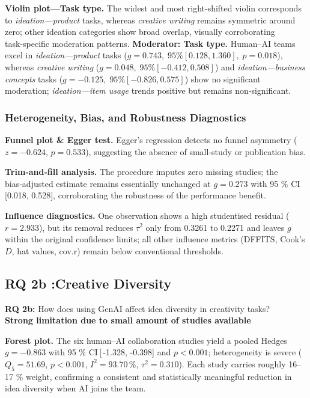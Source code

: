 \documentclass[manuscript, screen, review, acmsmall, anonymous]{acmart}
\begin{document}
\textbf{Violin plot—Task type.} The widest and most right‑shifted violin corresponds to \emph{ideation—product} tasks, whereas \emph{creative writing} remains symmetric around zero; other ideation categories show broad overlap, visually corroborating task‑specific moderation patterns.
\textbf{Moderator: Task type.} Human–AI teams excel in \emph{ideation—product} tasks (\(g = 0.743,\;95\% [0.128, 1.360],\;p = 0.018\)), whereas \emph{creative writing} (\(g = 0.048,\;95\% [-0.412, 0.508]\)) and \emph{ideation—business concepts} tasks (\(g = -0.125,\;95\% [-0.826, 0.575]\)) show no significant moderation; \emph{ideation—item usage} trends positive but remains non‑significant.

\subsubsection{Heterogeneity, Bias, and Robustness Diagnostics}
\textbf{Funnel plot \& Egger test.} Egger’s regression detects no funnel asymmetry ($z=-0.624$, $p=0.533$), suggesting the absence of small‑study or publication bias. 

\textbf{Trim‑and‑fill analysis.} The procedure imputes zero missing studies; the bias‑adjusted estimate remains essentially unchanged at $g = 0.273$ with 95 \% CI\,[0.018, 0.528], corroborating the robustness of the performance benefit.

\textbf{Influence diagnostics.} One observation shows a high studentised residual ($r = 2.933$), but its removal reduces $\tau^{2}$ only from 0.3261 to 0.2271 and leaves $g$ within the original confidence limits; all other influence metrics (DFFITS, Cook’s $D$, hat values, cov.r) remain below conventional thresholds. 

\subsection{RQ 2b :Creative Diversity}
\label{sec:CreativeDiversity}

\textbf{RQ 2b:} How does using GenAI affect idea diversity in creativity tasks? \\
\textbf{Strong limitation due to small amount of studies available}

\textbf{Forest plot.} The six human–AI collaboration studies yield a pooled Hedges\,$g = -0.863$ with 95 \% CI\,[\,-1.328, -0.398] and $p < 0.001$; heterogeneity is severe ($Q_{5}=51.69$, $p<0.001$, $I^{2}=93.70\,\%$, $\tau^{2}=0.310$). Each study carries roughly 16–17 \% weight, confirming a consistent and statistically meaningful reduction in idea diversity when AI joins the team. 
\end{document}
